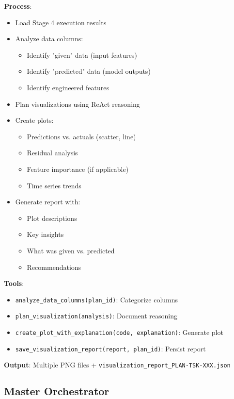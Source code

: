 \documentclass[11pt,a4paper]{article}
\begin{document}
\textbf{Process}:
\begin{itemize}
    \item Load Stage 4 execution results
    \item Analyze data columns:
    \begin{itemize}
        \item Identify "given" data (input features)
        \item Identify "predicted" data (model outputs)
        \item Identify engineered features
    \end{itemize}
    \item Plan visualizations using ReAct reasoning
    \item Create plots:
    \begin{itemize}
        \item Predictions vs. actuals (scatter, line)
        \item Residual analysis
        \item Feature importance (if applicable)
        \item Time series trends
    \end{itemize}
    \item Generate report with:
    \begin{itemize}
        \item Plot descriptions
        \item Key insights
        \item What was given vs. predicted
        \item Recommendations
    \end{itemize}
\end{itemize}

\textbf{Tools}:
\begin{itemize}
    \item \texttt{analyze\_data\_columns(plan\_id)}: Categorize columns
    \item \texttt{plan\_visualization(analysis)}: Document reasoning
    \item \texttt{create\_plot\_with\_explanation(code, explanation)}: Generate plot
    \item \texttt{save\_visualization\_report(report, plan\_id)}: Persist report
\end{itemize}

\textbf{Output}: Multiple PNG files + \texttt{visualization\_report\_PLAN-TSK-XXX.json}

\subsection{Master Orchestrator}
\end{document}
